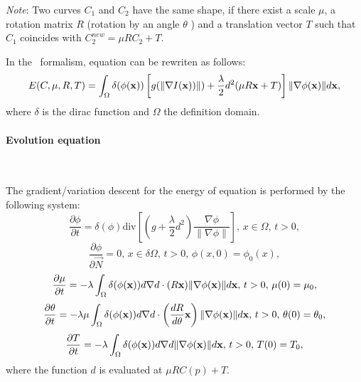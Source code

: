 \vspace{0.3cm}
\emph{Note}: Two curves $C_1$ and $C_2$ have the same shape, if there exist a scale $\mu$, a rotation matrix $R$ (rotation by an angle $\theta$ ) and a translation vector $T$ such that $C_1$ coincides with $C_2^{new} = \mu RC_2 + T$.

\vspace{0.3cm}
In the \ls~formalism, equation  can be rewriten as follows:
\begin{equation}
  \label{eq:NRJ-chen2}
  E(C, \mu, R, T) = \int_\Omega \delta(\phi(\mathbf{x})) \left[ g(\| \nabla I(\mathbf{x}))\|) + \frac{\lambda}{2}d^2(\mu R\mathbf{x} +T) \right] \| \nabla \phi(\mathbf{x}) \| d\mathbf{x},
\end{equation}
where $\delta$ is the dirac function and $\Omega$ the definition domain.

\paragraph{Evolution equation}
~\par \vspace{0.3cm}
The gradient/variation descent for the energy of equation  is performed by the following system:
\begin{equation}
  \label{eq:dphidt-chen}
  \frac{\partial \phi}{\partial t} = \delta(\phi) \text{div}\left[\left(g + \frac{\lambda}{2}d^2\right)\frac{\nabla \phi}{\| \nabla \phi \|}\right], \, x \in \Omega, \, t > 0,
\end{equation}
\begin{equation}
  \label{eq:dphidn-chen}
  \frac{\partial \phi}{\partial \vec{N}} = 0, \, x \in \delta\Omega, \, t > 0, \, \phi(x, 0) = \phi_0(x),
\end{equation}
\begin{equation}
  \label{eq:dmudt-chen}
  \frac{\partial \mu}{\partial t} = -\lambda \int_\Omega \delta(\phi(\mathbf{x})) d \nabla d \cdot (R\mathbf{x}) \| \nabla \phi(\mathbf{x}) \| d\mathbf{x}, \, t>0, \, \mu(0) = \mu_0,
\end{equation}
\begin{equation}
  \label{eq:dthetadt-chen}
  \frac{\partial \theta}{\partial t} = -\lambda \mu \int_\Omega \delta(\phi(\mathbf{x})) d \nabla d \cdot \left( \frac{dR}{d\theta} \mathbf{x} \right) \| \nabla \phi(\mathbf{x}) \| d\mathbf{x}, \, t>0, \, \theta(0) = \theta_0,
\end{equation}
\begin{equation}
  \label{eq:dTdt-chen}
  \frac{\partial T}{\partial t} = -\lambda \int_\Omega \delta(\phi(\mathbf{x})) d \nabla d \| \nabla \phi(\mathbf{x}) \| d\mathbf{x}, \, t>0, \, T(0) = T_0,
\end{equation}
where the function $d$ is evaluated at $\mu RC(p) + T$.



